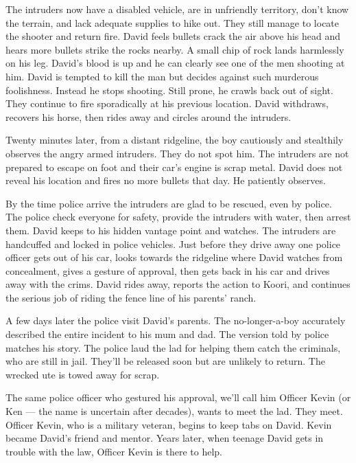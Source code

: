 The intruders now have a disabled vehicle, are in unfriendly territory, don't know the terrain, and lack adequate supplies to hike out.  They still manage to locate the shooter and return fire.  David feels bullets crack the air above his head and hears more bullets strike the rocks nearby. A small chip of rock lands harmlessly on his leg.  David's blood is up and he can clearly see one of the men shooting at him. David is tempted to kill the man but decides against such murderous foolishness. Instead he stops shooting. Still prone, he crawls back out of sight.  They continue to fire sporadically at his previous location.  David withdraws, recovers his horse, then rides away and circles around the intruders.

Twenty minutes later, from a distant ridgeline, the boy cautiously and stealthily observes the angry armed intruders. They do not spot him. The intruders are not prepared to escape on foot and their car's engine is scrap metal. David does not reveal his location and fires no more bullets that day.  He patiently observes.

By the time police arrive the intruders are glad to be rescued, even by police.   The police check everyone for safety, provide the intruders with water, then arrest them.  David keeps to his hidden vantage point and watches.   The intruders are handcuffed and locked in police vehicles.  Just before they drive away one police officer gets out of his car, looks towards the ridgeline where David watches from concealment, gives a gesture of approval, then gets back in his car and drives away with the crims.  David rides away, reports the action to Koori, and continues the serious job of riding the fence line of his parents' ranch.

A few days later the police visit David's parents.  The no-longer-a-boy accurately described the entire incident to his mum and dad.  The version told by police matches his story.  The police laud the lad for helping them catch the criminals, who are still in jail. They'll be released soon but are unlikely to return. The wrecked ute is towed away for scrap.

The same police officer who gestured his approval, we'll call him Officer Kevin (or Ken --- the name is uncertain after decades), wants to meet the lad.  They meet.  Officer Kevin, who is a military veteran, begins to keep tabs on David.  Kevin became David's friend and mentor.  Years later, when teenage David gets in trouble with the law, Officer Kevin is there to help.

